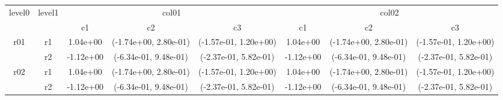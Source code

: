 \begin{tabular}{cccccccc}
\toprule
\multirow{2}{*}{level0} & \multirow{2}{*}{level1}&\multicolumn{3}{c}{col01}&\multicolumn{3}{c}{col02}\tabularnewline
\cmidrule(lr){3-5}
\cmidrule(lr){6-8}
&&c1&c2&c3&c1&c2&c3\tabularnewline
\midrule
\midrule
\multirow{2}{*}{r01}&r1&1.04e+00& (-1.74e+00, 2.80e-01)& (-1.57e-01, 1.20e+00)&1.04e+00& (-1.74e+00, 2.80e-01)& (-1.57e-01, 1.20e+00)\tabularnewline
&r2&-1.12e+00& (-6.34e-01, 9.48e-01)& (-2.37e-01, 5.82e-01)&-1.12e+00& (-6.34e-01, 9.48e-01)& (-2.37e-01, 5.82e-01)\tabularnewline
\midrule
\multirow{2}{*}{r02}&r1&1.04e+00& (-1.74e+00, 2.80e-01)& (-1.57e-01, 1.20e+00)&1.04e+00& (-1.74e+00, 2.80e-01)& (-1.57e-01, 1.20e+00)\tabularnewline
&r2&-1.12e+00& (-6.34e-01, 9.48e-01)& (-2.37e-01, 5.82e-01)&-1.12e+00& (-6.34e-01, 9.48e-01)& (-2.37e-01, 5.82e-01)\tabularnewline
\bottomrule
\end{tabular}

